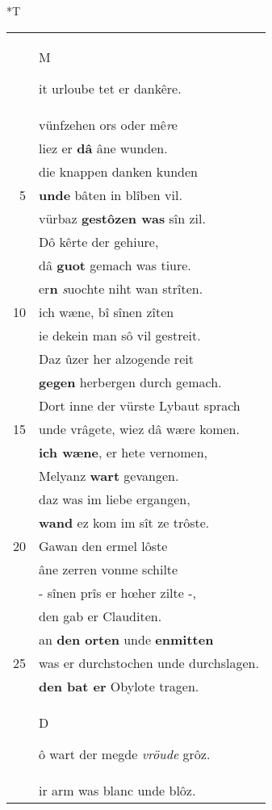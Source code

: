 \documentclass[8pt,a4paper,notitlepage]{article}
\begin{document}
\begin{table}[ht]
\begin{minipage}[t]{0.5\linewidth}
\small
\begin{center}*T
\end{center}
\begin{tabular}{rl}
 & \begin{large}M\end{large}it urloube tet er dankêre.\\ 
 & vünfzehen ors oder mê\textit{r}e\\ 
 & liez er \textbf{dâ} âne wunden.\\ 
 & die knappen danken kunden\\ 
5 & \textbf{unde} bâten in blîben vil.\\ 
 & vürbaz \textbf{gestôzen was} sîn zil.\\ 
 & Dô kêrte der gehiure,\\ 
 & dâ \textbf{guot} gemach was tiure.\\ 
 & er\textbf{n} \textit{s}uochte niht wan strîten.\\ 
10 & ich wæne, bî sînen zîten\\ 
 & ie dekein man sô vil gestreit.\\ 
 & Daz ûzer her alzogende reit\\ 
 & \textbf{gegen} herbergen durch gemach.\\ 
 & Dort inne der vürste Lybaut sprach\\ 
15 & unde vrâgete, wiez dâ wære komen.\\ 
 & \textbf{ich wæne}, er hete vernomen,\\ 
 & Melyanz \textbf{wart} gevangen.\\ 
 & daz was im liebe ergangen,\\ 
 & \textbf{wand} ez kom im sît ze trôste.\\ 
20 & Gawan den ermel lôste\\ 
 & âne zerren vonme schilte\\ 
 & - sînen prîs er hœher zilte -,\\ 
 & den gab er Clauditen.\\ 
 & an \textbf{den orten} unde \textbf{enmitten}\\ 
25 & was er durchstochen unde durchslagen.\\ 
 & \textbf{den bat er} Obylote tragen.\\ 
 & \begin{large}D\end{large}ô wart der megde \textit{vröude} grôz.\\ 
 & ir arm was blanc unde blôz.\\ 

\end{tabular}
\end{minipage}
\end{table}
\end{document}
